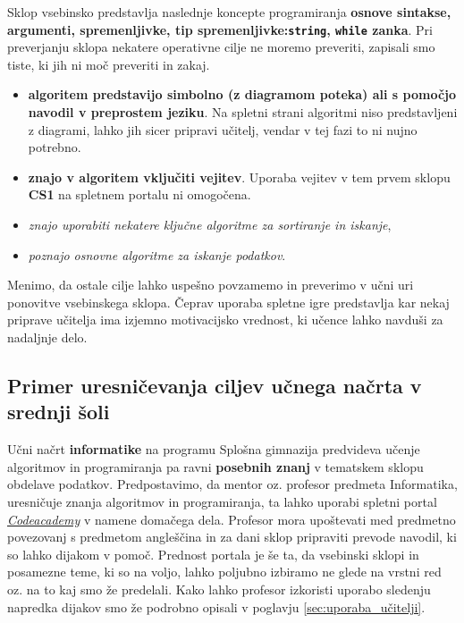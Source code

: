 Sklop vsebinsko predstavlja naslednje koncepte programiranja
\textbf{osnove sintakse, argumenti, spremenljivke, tip
  spremenljivke:\texttt{string}, \texttt{while} zanka}. Pri
preverjanju sklopa nekatere operativne cilje ne moremo preveriti,
zapisali smo tiste, ki jih ni moč preveriti in zakaj.

\begin{itemize}
\tightlist
\item \textbf{algoritem predstavijo simbolno (z diagramom poteka) ali s
  pomočjo navodil v preprostem jeziku}. Na spletni strani algoritmi
niso predstavljeni z diagrami, lahko jih sicer pripravi učitelj,
vendar v tej fazi to ni nujno potrebno.
\item \textbf{znajo v algoritem vključiti vejitev}. Uporaba vejitev v
  tem prvem sklopu \textbf{CS1} na spletnem portalu ni omogočena.
\item \emph{znajo uporabiti nekatere ključne algoritme za sortiranje in
  iskanje},
\item \emph{poznajo osnovne algoritme za iskanje podatkov}.
\end{itemize}

Menimo, da ostale cilje lahko uspešno povzamemo in preverimo v učni
uri ponovitve vsebinskega sklopa. Čeprav uporaba spletne igre
predstavlja kar nekaj priprave učitelja ima izjemno motivacijsko
vrednost, ki učence lahko navduši za nadaljnje delo.

\subsection{Primer uresničevanja ciljev učnega načrta v srednji šoli}
\label{sec:prim-uresn-cil-ss}

Učni načrt \textbf{informatike} na programu Splošna gimnazija
predvideva učenje algoritmov in programiranja pa ravni
\textbf{posebnih znanj} v tematskem sklopu obdelave
podatkov. Predpostavimo, da mentor oz. profesor predmeta Informatika,
uresničuje znanja algoritmov in programiranja, ta lahko uporabi
spletni portal \emph{\href{https://www.codecademy.com/}{Codeacademy}}
\cite{web:codeacademy} v namene domačega dela. Profesor mora
upoštevati med predmetno povezovanj s predmetom angleščina in za dani
sklop pripraviti prevode navodil, ki so lahko dijakom v
pomoč. Prednost portala je še ta, da vsebinski sklopi in posamezne
teme, ki so na voljo, lahko poljubno izbiramo ne glede na vrstni red
oz. na to kaj smo že predelali. Kako lahko profesor izkoristi uporabo
sledenju napredka dijakov smo že podrobno opisali v poglavju
\ref{sec:uporaba_učitelji}.

